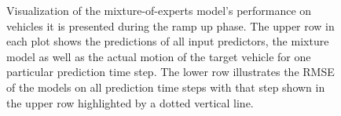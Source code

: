 \begin{figure}[t!]
    \centering
    \vspace{-0.45cm}
    \vspace{-0.45cm}
    \caption{Visualization of the mixture-of-experts model's performance on vehicles it is presented during the ramp up phase.
    The upper row in each plot shows the predictions of all input predictors, the mixture model as well as the actual motion of the target vehicle for one particular prediction time step.
The lower row illustrates the \ac{RMSE} of the models on all prediction time steps with that step shown in the upper row highlighted by a dotted vertical line.}
\label{fig:mix_train_obj}
\end{figure}

